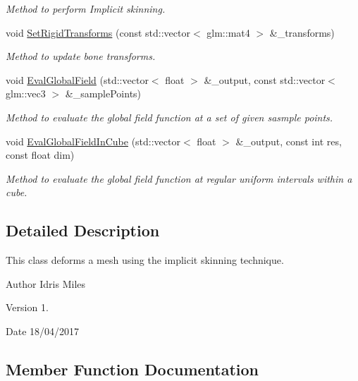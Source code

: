 \begin{DoxyCompactItemize}
\begin{DoxyCompactList}\small\item\em Method to perform Implicit skinning. \end{DoxyCompactList}\item 
void \hyperlink{classImplicitSkinDeformer_a20c918023dd46eb0d3b4df7f9873686c}{Set\+Rigid\+Transforms} (const std\+::vector$<$ glm\+::mat4 $>$ \&\+\_\+transforms)
\begin{DoxyCompactList}\small\item\em Method to update bone transforms. \end{DoxyCompactList}\item 
void \hyperlink{classImplicitSkinDeformer_a53fe153bdf7345773a2b1d2ad4b2698e}{Eval\+Global\+Field} (std\+::vector$<$ float $>$ \&\+\_\+output, const std\+::vector$<$ glm\+::vec3 $>$ \&\+\_\+sample\+Points)
\begin{DoxyCompactList}\small\item\em Method to evaluate the global field function at a set of given sasmple points. \end{DoxyCompactList}\item 
void \hyperlink{classImplicitSkinDeformer_a8b9c5d17557ec3cf44ed982a8930e890}{Eval\+Global\+Field\+In\+Cube} (std\+::vector$<$ float $>$ \&\+\_\+output, const int res, const float dim)
\begin{DoxyCompactList}\small\item\em Method to evaluate the global field function at regular uniform intervals within a cube. \end{DoxyCompactList}\end{DoxyCompactItemize}


\subsection{Detailed Description}
This class deforms a mesh using the implicit skinning technique. 

\begin{DoxyAuthor}{Author}
Idris Miles 
\end{DoxyAuthor}
\begin{DoxyVersion}{Version}
1. 
\end{DoxyVersion}
\begin{DoxyDate}{Date}
18/04/2017 
\end{DoxyDate}


\subsection{Member Function Documentation}
